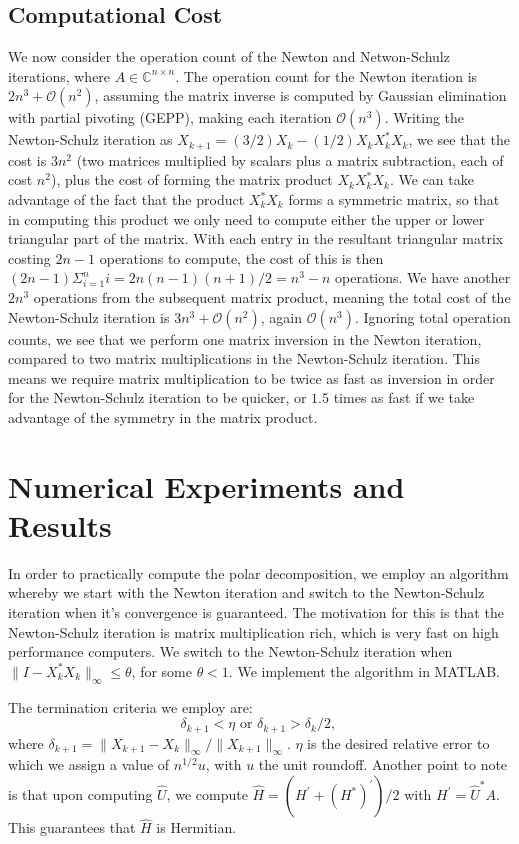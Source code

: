 \documentclass[12pt]{article}
\def\C{\mathbb{C}}
\def\nbyn{n \times n}
\def\normo#1{\|#1\|_{\infty}}
\begin{document}
\subsection{Computational Cost}
We now consider the operation count of the Newton and Netwon-Schulz iterations,
where $A \in \C^{\nbyn}$. The operation count for the Newton iteration is
$2n^3 + \mathcal{O}(n^2)$, assuming the matrix inverse is computed by Gaussian
elimination with partial pivoting (GEPP), making each iteration
$\mathcal{O}(n^3)$. Writing the Newton-Schulz iteration as
$X_{k+1} = (3/2)X_k - (1/2)X_kX_k^*X_k$, we see that the cost is $3n^2$ (two
matrices multiplied by scalars plus a matrix subtraction, each of cost $n^2$),
plus the cost of forming the matrix product $X_kX_k^*X_k$. We can take
advantage of the fact that the product $X_k^*X_k$ forms a symmetric matrix, so
that in computing this product we only need to compute either the upper or lower
triangular part of the matrix. With each entry in the resultant triangular
matrix costing $2n-1$ operations to compute, the cost of this is then
$(2n-1)\Sigma_{i=1}^n i = 2n(n-1)(n+1)/2 = n^3 - n$ operations. We have another
$2n^3$ operations from the subsequent matrix product, meaning the total cost of
the Newton-Schulz iteration is $3n^3 + \mathcal{O}(n^2)$, again
$\mathcal{O}(n^3)$. Ignoring total operation counts, we see that we perform one
matrix inversion in the Newton iteration, compared to two matrix multiplications
in the Newton-Schulz iteration. This means we require matrix multiplication to
be twice as fast as inversion in order for the Newton-Schulz iteration to be
quicker, or $1.5$ times as fast if we take advantage of the symmetry in the
matrix product.

\section{Numerical Experiments and Results}
In order to practically compute the polar decomposition, we employ an algorithm
whereby we start with the Newton iteration and switch to the Newton-Schulz
iteration when it's convergence is guaranteed. The motivation for this is that
the Newton-Schulz iteration is matrix multiplication rich,
which is very fast on high performance computers.
We switch to the Newton-Schulz iteration when
$\normo{I - X_k^*X_k} \leq \theta$, for some $\theta < 1$.
We implement the algorithm in MATLAB.

The termination criteria we employ are:
\begin{equation*}
  \delta_{k+1} < \eta \text{ or } \delta_{k+1} > \delta_k /2\text{, }
\end{equation*}
where $\delta_{k+1} = \normo{X_{k+1} - X_k}/\normo{X_{k+1}}$. $\eta$ is the
desired relative error to which we assign a value of $n^{1/2}u$, with $u$ the
unit roundoff. Another point to note is that upon computing $\hat{U}$, we
compute $\hat{H} = (H^{\prime} + (H^*)^{\prime})/2$ with
$H^{\prime} = \hat{U}^*A$. This guarantees that $\hat{H}$ is Hermitian.
\end{document}
